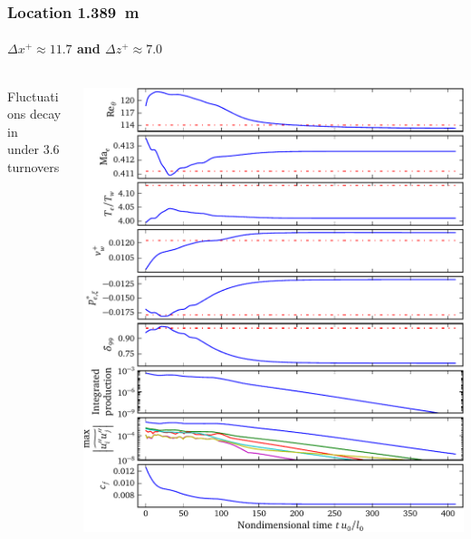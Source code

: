 \documentclass[mathserif]{beamer}
\begin{document}
\begin{frame}
    \frametitle{Location 1.389~m}
    \framesubtitle{$\Delta{}x^{+}\approx{}11.7$ and $\Delta{}z^{+}\approx{}7.0$}
    \begin{columns}[c,onlytextwidth]
    \begin{column}{.35\linewidth}
        \scriptsize
        Fluctuations decay in\\under 3.6 turnovers
    \end{column}
    \begin{column}{.65\linewidth}
        \vspace{-3.75em}
        \begin{flushright}
            \includegraphics[height=0.99\textheight]{relam1389}
        \end{flushright}
    \end{column}
    \end{columns}
\end{frame}

\end{document}
